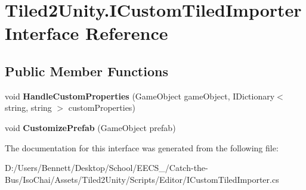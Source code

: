 \hypertarget{interface_tiled2_unity_1_1_i_custom_tiled_importer}{}\section{Tiled2\+Unity.\+I\+Custom\+Tiled\+Importer Interface Reference}
\label{interface_tiled2_unity_1_1_i_custom_tiled_importer}
\subsection*{Public Member Functions}
\begin{DoxyCompactItemize}
\item 
\mbox{\label{interface_tiled2_unity_1_1_i_custom_tiled_importer_af4c9e46be5df1af5cbd4ac2114c8fcd8}} 
void {\bfseries Handle\+Custom\+Properties} (Game\+Object game\+Object, I\+Dictionary$<$ string, string $>$ custom\+Properties)
\item 
\mbox{\label{interface_tiled2_unity_1_1_i_custom_tiled_importer_af2334f3b1851b0f84ba8b1035333cffd}} 
void {\bfseries Customize\+Prefab} (Game\+Object prefab)
\end{DoxyCompactItemize}


The documentation for this interface was generated from the following file\+:\begin{DoxyCompactItemize}
\item 
D\+:/\+Users/\+Bennett/\+Desktop/\+School/\+E\+E\+C\+S\+\_/\+Catch-\/the-\/\+Bus/\+Iso\+Chai/\+Assets/\+Tiled2\+Unity/\+Scripts/\+Editor/I\+Custom\+Tiled\+Importer.\+cs\end{DoxyCompactItemize}
